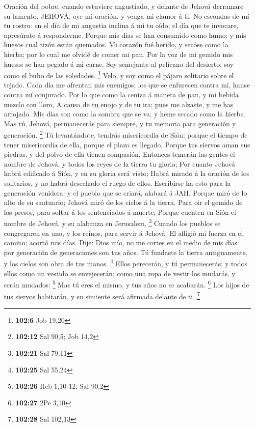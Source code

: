  Oración del pobre, cuando estuviere angustiado, y delante
de Jehová derramare su lamento. JEHOVÁ, oye mi oración, y venga mi
clamor á ti.  No escondas de mí tu rostro: en el día de mi
angustia inclina á mí tu oído; el día que te invocare, apresúrate á
responderme.  Porque mis días se han consumido como humo; y
mis huesos cual tizón están quemados.  Mi corazón fué
herido, y secóse como la hierba; por lo cual me olvidé de comer mi pan.
 Por la voz de mi gemido mis huesos se han pegado á mi
carne.  Soy semejante al pelícano del desierto; soy como el
buho de las soledades. \footnote{\textbf{102:6} Job 19,20} 
Velo, y soy como el pájaro solitario sobre el tejado.  Cada
día me afrentan mis enemigos; los que se enfurecen contra mí, hanse
contra mí conjurado.  Por lo que como la ceniza á manera de
pan, y mi bebida mezclo con lloro,  A causa de tu enojo y
de tu ira; pues me alzaste, y me has arrojado.  Mis días
son como la sombra que se va; y heme secado como la hierba.
 Mas tú, Jehová, permanecerás para siempre, y tu memoria
para generación y generación. \footnote{\textbf{102:12} Sal 90,5; Job
  14,2}  Tú levantándote, tendrás misericordia de Sión;
porque el tiempo de tener misericordia de ella, porque el plazo es
llegado.  Porque tus siervos aman sus piedras, y del polvo
de ella tienen compasión.  Entonces temerán las gentes el
nombre de Jehová, y todos los reyes de la tierra tu gloria;
 Por cuanto Jehová habrá edificado á Sión, y en su gloria
será visto;  Habrá mirado á la oración de los solitarios, y
no habrá desechado el ruego de ellos.  Escribirse ha esto
para la generación venidera: y el pueblo que se criará, alabará á JAH.
 Porque miró de lo alto de su santuario; Jehová miró de los
cielos á la tierra,  Para oir el gemido de los presos, para
soltar á los sentenciados á muerte;  Porque cuenten en Sión
el nombre de Jehová, y su alabanza en Jerusalem, \footnote{\textbf{102:21}
  Sal 79,11}  Cuando los pueblos se congregaren en uno, y
los reinos, para servir á Jehová.  El afligió mi fuerza en
el camino; acortó mis días.  Dije: Dios mío, no me cortes
en el medio de mis días: por generación de generaciones son tus años.
 Tú fundaste la tierra antiguamente, y los cielos son obra
de tus manos. \footnote{\textbf{102:25} Sal 55,24}  Ellos
perecerán, y tú permanecerás; y todos ellos como un vestido se
envejecerán; como una ropa de vestir los mudarás, y serán mudados:
\footnote{\textbf{102:26} Heb 1,10-12; Sal 90,2}  Mas tú
eres el mismo, y tus años no se acabarán. \footnote{\textbf{102:27} 2Pe
  3,10}  Los hijos de tus siervos habitarán, y su simiente
será afirmada delante de ti. \footnote{\textbf{102:28} Sal 102,13}


